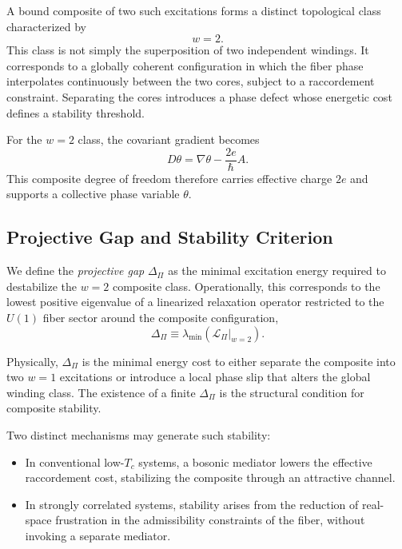     A bound composite of two such excitations forms a distinct
    topological class characterized by
    \begin{equation}
      w = 2 .
    \end{equation}
    This class is not simply the superposition of two independent windings.
    It corresponds to a globally coherent configuration in which
    the fiber phase interpolates continuously between the two cores,
    subject to a raccordement constraint.
    Separating the cores introduces a phase defect
    whose energetic cost defines a stability threshold.

    For the $w=2$ class, the covariant gradient becomes
    \begin{equation}
      D\theta = \nabla \theta - \frac{2e}{\hbar} A .
      \label{eq:covariant-theta-2e}
    \end{equation}
    This composite degree of freedom therefore carries effective charge $2e$
    and supports a collective phase variable $\theta$.

  \subsection{Projective Gap and Stability Criterion}
    \label{subsec:projective-gap}

    We define the \emph{projective gap} $\Delta_\Pi$
    as the minimal excitation energy required
    to destabilize the $w=2$ composite class.
    Operationally, this corresponds to the lowest positive eigenvalue
    of a linearized relaxation operator
    restricted to the $U(1)$ fiber sector
    around the composite configuration,
    \begin{equation}
      \Delta_\Pi \equiv
      \lambda_{\min}
      \left(
        \mathcal{L}_\Pi \big|_{w=2}
      \right) .
      \label{eq:projective-gap}
    \end{equation}

    Physically, $\Delta_\Pi$ is the minimal energy cost
    to either separate the composite into two $w=1$ excitations
    or introduce a local phase slip that alters
    the global winding class.
    The existence of a finite $\Delta_\Pi$
    is the structural condition for composite stability.

    Two distinct mechanisms may generate such stability:

    \begin{itemize}
      \item In conventional low-$T_c$ systems,
      a bosonic mediator lowers the effective raccordement cost,
      stabilizing the composite through an attractive channel.
      \item In strongly correlated systems,
      stability arises from the reduction of real-space frustration
      in the admissibility constraints of the fiber,
      without invoking a separate mediator.
    \end{itemize}

